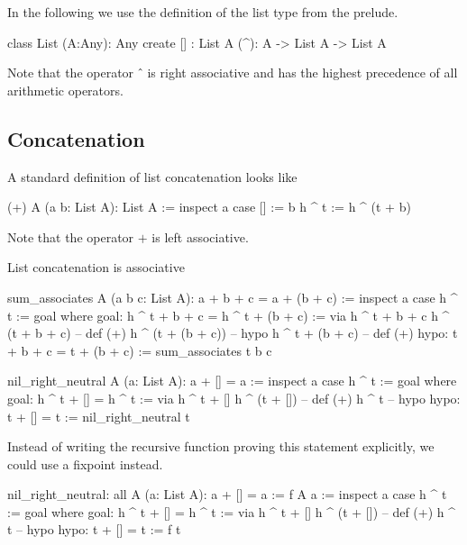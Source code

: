 In the following we use the definition of the list type from the prelude.

\begin{alba}
  class
    List (A:Any): Any
  create
    [] : List A
    (^): A -> List A -> List A
\end{alba}
%
Note that the operator $\mathrel{\hat{\ }}$ is right associative and has the
highest precedence of all arithmetic operators.



\subsection{Concatenation}


A standard definition of list concatenation looks like

\begin{alba}
  (+) A (a b: List A): List A :=
    inspect a case
      [] :=
        b
      h ^ t :=
        h ^ (t + b)
\end{alba}
Note that the operator $+$ is left associative.


List concatenation is associative
%
\begin{alba}
  sum_associates A (a b c: List A): a + b + c = a + (b + c) :=
    inspect a case
      h ^ t :=
        goal where
          goal: h ^ t + b + c = h ^ t + (b + c) :=
            via
               h ^ t + b + c
               h ^ (t + b + c)      -- def (+)
               h ^ (t + (b + c))    -- hypo
               h ^ t + (b + c)      -- def (+)
          hypo: t + b + c = t + (b + c) :=
            sum_associates t b c
\end{alba}


\begin{alba}
  nil_right_neutral A (a: List A): a + [] = a :=
    inspect a case
      h ^ t :=
        goal where
          goal: h ^ t + [] = h ^ t :=
            via
              h ^ t + []
              h ^ (t + [])   -- def (+)
              h ^ t          -- hypo
          hypo: t + [] = t :=
            nil_right_neutral t
\end{alba}

Instead of writing the recursive function proving this statement explicitly,
we could use a fixpoint instead.

\begin{alba}
  nil_right_neutral: all A (a: List A): a + [] = a :=
    f A a :=
      inspect a case
        h ^ t :=
          goal where
            goal: h ^ t + [] = h ^ t :=
              via
                h ^ t + []
                h ^ (t + [])   -- def (+)
                h ^ t          -- hypo
            hypo: t + [] = t :=
              f t
\end{alba}



